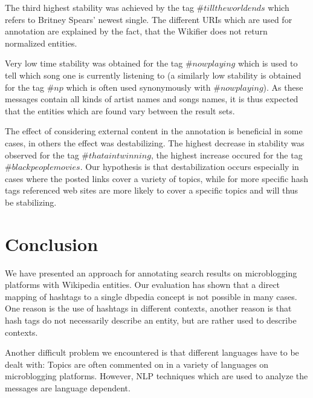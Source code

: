 \documentclass{llncs}
\begin{document}
The third highest stability was achieved by the tag $\#tilltheworldends$ which refers to Britney Spears' newest single. The different URIs which are used for annotation are explained by the fact, that the Wikifier does not return normalized entities.

Very low time stability was obtained for the tag $\#nowplaying$ which is used to tell which song one is currently listening to (a similarly low stability is obtained for the tag $\#np$ which is often used synonymously with $\#nowplaying$). As these messages contain all kinds of artist names and songs names, it is thus expected that the entities which are found vary between the result sets.

The effect of considering external content in the annotation is beneficial in some cases, in others the effect was destabilizing. The highest decrease in stability was observed for the tag $\#thataintwinning$, the highest increase occured for the tag $\#blackpeoplemovies$. Our hypothesis is that destabilization occurs especially in cases where the posted links cover a variety of topics, while for more specific hash tags referenced web sites are more likely to cover a specific topics and will thus be stabilizing.





\section{Conclusion}
\label{sect:conclusion}

We have presented an approach for annotating search results on microblogging platforms with Wikipedia entities. Our evaluation has shown that a direct mapping of hashtags to a single dbpedia concept is not possible in many cases. One reason is the use of hashtags in different contexts, another reason is that hash tags do not necessarily describe an entity, but are rather used to describe contexts.

Another difficult problem we encountered is that different languages have to be dealt with: Topics are often commented on in a variety of languages on microblogging platforms. However, NLP techniques which are used to analyze the messages are language dependent.





\end{document}
